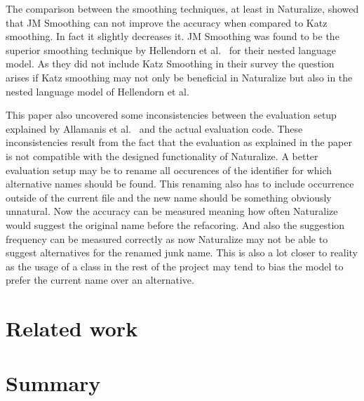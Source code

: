 \documentclass[sigconf]{acmart}
\begin{document}
The comparison between the smoothing techniques, at least in Naturalize, showed that JM Smoothing can not improve the accuracy when compared to Katz smoothing. In fact it slightly decreases it. JM Smoothing was found to be the superior smoothing technique by Hellendorn et al.~\cite{nestedngram} for their nested language model. As they did not include Katz Smoothing in their survey the question arises if Katz smoothing may not only be beneficial in Naturalize but also in the nested language model of Hellendorn et al.

This paper also uncovered some inconsistencies between the evaluation setup explained by Allamanis et al.~\cite{naturalize} and the actual evaluation code. These inconsistencies result from the fact that the evaluation as explained in the paper is not compatible with the designed functionality of Naturalize. A better evaluation setup may be to rename all occurences of the identifier for which alternative names should be found. This renaming also has to include occurrence outside of the current file and the new name should be something obviously unnatural. Now the accuracy can be measured meaning how often Naturalize would suggest the original name before the refacoring. And also the suggestion frequency can be measured correctly as now Naturalize may not be able to suggest alternatives for the renamed junk name. This is also a lot closer to reality as the usage of a class in the rest of the project may tend to bias the model to prefer the current name over an alternative.
\section{Related work}

\section{Summary}








\end{document}
